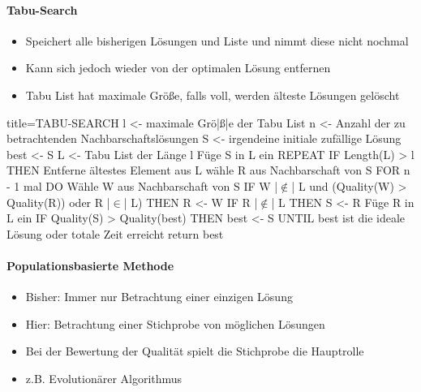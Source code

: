 \documentclass[
    ngerman,
    color=3b,
    dark_mode,
    load_common, %
    summary,
    boxarc,
]{tuda_summary}
\begin{document}
\paragraph{Tabu-Search}\mbox{}
\begin{idea}\mbox{}
    \begin{itemize}
        \item Speichert alle bisherigen Lösungen und Liste und nimmt diese nicht nochmal
        \item Kann sich jedoch wieder von der optimalen Lösung entfernen
        \item Tabu List hat maximale Grö\ss e, falls voll, werden älteste Lösungen gelöscht
    \end{itemize}
\end{idea}
\begin{codeBlock}[autogobble,escapeinside=||,fontsize=\footnotesize]{title={TABU-SEARCH}}
    l <- maximale Grö|\ss{}|e der Tabu List
    n <- Anzahl der zu betrachtenden Nachbarschaftslösungen
    S <- irgendeine initiale zufällige Lösung
    best <- S
    L <- { } Tabu List der Länge l
    Füge S in L ein
    REPEAT
        IF Length(L) > l THEN
            Entferne ältestes Element aus L
        wähle R aus Nachbarschaft von S
        FOR n - 1 mal DO
            Wähle W aus Nachbarschaft von S
            IF W |$\notin$| L und (Quality(W) > Quality(R)) oder R |$\in$| L) THEN
                R <- W
        IF R |$\notin$| L THEN
            S <- R
            Füge R in L ein
        IF Quality(S) > Quality(best) THEN
            best <- S
    UNTIL best ist die ideale Lösung oder totale Zeit erreicht
    return best
\end{codeBlock}


\clearpage

\paragraph{Populationsbasierte Methode}
\begin{itemize}
    \item Bisher: Immer nur Betrachtung einer einzigen Lösung
    \item Hier: Betrachtung einer Stichprobe von möglichen Lösungen
    \item Bei der Bewertung der Qualität spielt die Stichprobe die Hauptrolle
    \item z.B. Evolutionärer Algorithmus
\end{itemize}
\end{document}
